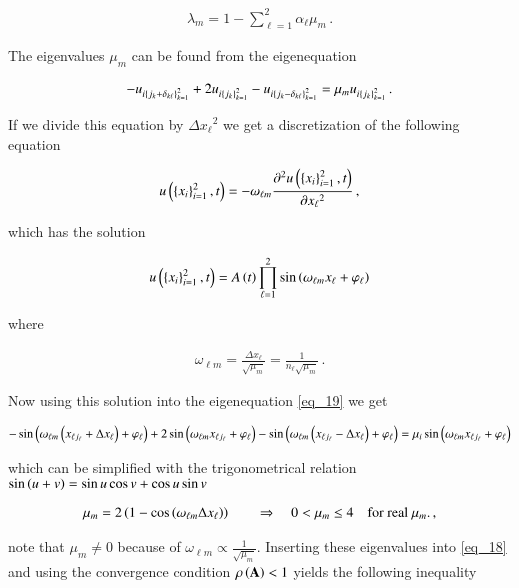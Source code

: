 \documentclass[11pt,english,a4paper]{article}
\begin{document}
\begin{flushleft}
\begin{align}
\lambda_m = 1 - \sum_{\ell=1}^2 \alpha_\ell \mu_m\,.
\label{eq_18}
\end{align}

The eigenvalues $\mu_m$ can be found from the eigenequation

\begin{align}
-u_{i\left\lbrace{j_k + \delta_{k\ell}}\right\rbrace_{k=1}^2} + 2 u_{i\left\lbrace{j_k}\right\rbrace_{k=1}^2}-u_{i\left\lbrace{j_k - \delta_{k\ell}}\right\rbrace_{k=1}^2} = \mu_m u_{i\left\lbrace{j_k}\right\rbrace_{k=1}^2} \,.
\label{eq_19}
\end{align}

If we divide this equation by ${\Delta x_\ell}^2$ we get a discretization of the following equation

\begin{align*}
u\left({\left\lbrace{x_i}\right\rbrace_{i=1}^2,t}\right) = -\omega_{\ell m} \frac{\partial^2 u\left({\left\lbrace{x_i}\right\rbrace_{i=1}^2,t}\right)}{\partial {x_\ell}^2}\,,
\end{align*}

which has the solution 

\begin{align*}
u\left({\left\lbrace{x_i}\right\rbrace_{i=1}^2, t}\right) = A\left({t}\right) \prod_{\ell=1}^2 \sin\left({\omega_{\ell m} x_\ell + \varphi_\ell}\right)
\end{align*}

where 

\begin{align*}
\omega_{\ell m} = \frac{\Delta {x_\ell}}{\sqrt{\mu_m}} = \frac{1}{n_\ell\sqrt{\mu_m}}\,.
\end{align*}

Now using this solution into the eigenequation \eqref{eq_19} we get

\begin{align*}
-\sin\left({\omega_{\ell m} \left({x_{\ell j_\ell}+\Delta x_\ell}\right) + \varphi_\ell}\right) + 2\sin\left({\omega_{\ell m} x_{\ell j_\ell} + \varphi_\ell}\right) - \sin\left({\omega_{\ell m} \left({x_{\ell j_\ell}-\Delta x_\ell}\right) + \varphi_\ell}\right) = \mu_i \sin\left({\omega_{\ell m} x_{\ell j_\ell} + \varphi_\ell}\right)
\end{align*} 

which can be simplified with the trigonometrical relation $\sin\left({u+v}\right) = \sin u \cos v + \cos u \sin v$
 
\begin{align*}
\mu_m = 2\left({1-\cos\left({\omega_{\ell m} \Delta x_\ell}\right)}\right) \qquad \Rightarrow \quad 0 < \mu_m \leq 4 \quad \text{for real $\mu_m$.} \,,
\end{align*}

note that $\mu_m\neq 0$ because of $\omega_{\ell m} \propto \frac{1}{\sqrt{\mu_m}}$. Inserting these eigenvalues into \eqref{eq_18} and using the convergence condition $\rho\left({\textbf{A}}\right) < 1$ yields the following inequality


\end{flushleft}
\end{document}
